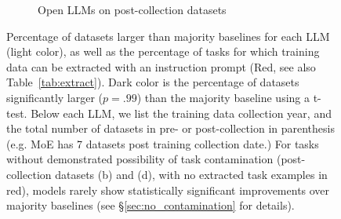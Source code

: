 \documentclass[letterpaper]{article} %
\begin{document}
\begin{figure}[t]
\begin{subfigure}[b]{0.45\textwidth}
            \caption[]%
            {Open LLMs on post-collection datasets}
            \label{fig:Few shot performance for old datasets2}
        \end{subfigure}
        \caption[]
        {Percentage of datasets larger than majority baselines for each LLM (light color), as well as the percentage of tasks for which training data can be extracted with an instruction prompt (Red, see also Table~\ref{tab:extract}). Dark color is the percentage of datasets significantly larger ($p=.99$) than the majority baseline using a t-test. Below each LLM, we list the training data collection year, and the total number of datasets in pre- or post-collection in parenthesis (e.g. MoE has 7 datasets post training collection date.)  For tasks without demonstrated possibility of task contamination (post-collection datasets (b) and (d), with no extracted task examples in red), models rarely show statistically significant improvements over majority baselines (see \S\ref{sec:no_contamination} for details).}
        \label{fig:experiments-majority}
    \end{figure}
\end{document}
